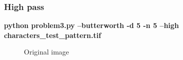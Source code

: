        \pagebreak
        \subsubsection{High pass}

        \small{\textbf{python problem3.py --butterworth -d 5 -n 5 --high characters\_test\_pattern.tif}}

        \begin{figure}[!htb]\centering
            \begin{minipage}{0.45\textwidth}
                \caption{\small{Original image}}
            \end{minipage}
            \begin{minipage}{0.45\textwidth}

\end{minipage}
\end{figure}
